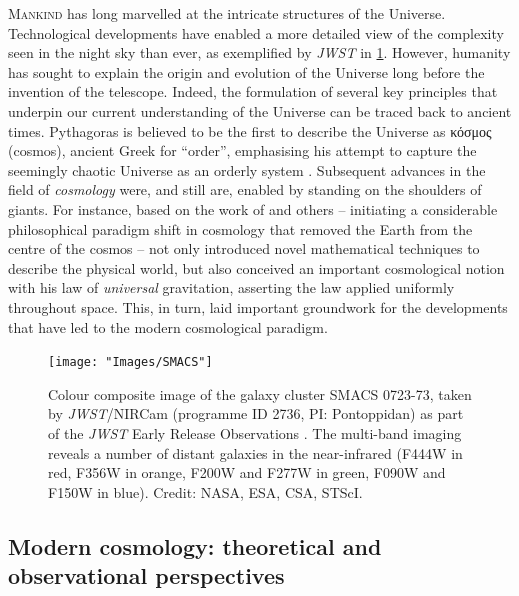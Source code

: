 \lettrine{M}{ankind} has long marvelled at the intricate structures of the Universe. Technological developments have enabled a more detailed view of the complexity seen in the night sky than ever, as exemplified by \textit{JWST} in \cref{chIfig:SMACS}. However, humanity has sought to explain the origin and evolution of the Universe long before the invention of the telescope. Indeed, the formulation of several key principles that underpin our current understanding of the Universe can be traced back to ancient times. Pythagoras is believed to be the first to describe the Universe as \textgreek{κόσμος} (cosmos), ancient Greek for ``order'', emphasising his attempt to capture the seemingly chaotic Universe as an orderly system \citep[e.g.][]{1860Humboldt}. Subsequent advances in the field of \textit{cosmology} were, and still are, enabled by standing on the shoulders of giants. For instance, based on the work of \citet{Copernicus1543} and others -- initiating a considerable philosophical paradigm shift in cosmology that removed the Earth from the centre of the cosmos -- \citet{Newton1687} not only introduced novel mathematical techniques to describe the physical world, but also conceived an important cosmological notion with his law of \textit{universal} gravitation, asserting the law applied uniformly throughout space. This, in turn, laid important groundwork for the developments that have led to the modern cosmological paradigm.
\begin{figure}
    \centering
    \texttt{[image: "Images/SMACS"]}
    \caption[Colour composite image of the galaxy cluster SMACS 0723-73.]{Colour composite image of the galaxy cluster SMACS 0723-73, taken by \textit{JWST}/NIRCam (programme ID 2736, PI: Pontoppidan) as part of the \textit{JWST} Early Release Observations \citep[EROs;][]{2022ApJ...936L..14P}. The multi-band imaging reveals a number of distant galaxies in the near-infrared (F444W in red, F356W in orange, F200W and F277W in green, F090W and F150W in blue). Credit: NASA, ESA, CSA, STScI.}
    \label{chIfig:SMACS}
\end{figure}

\subsection{Modern cosmology: theoretical and observational perspectives}
\label{chIssec:Modern_cosmology}

